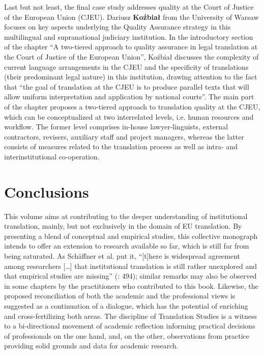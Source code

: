 \documentclass[output=paper]{langsci/langscibook}
\begin{document}
Last but not least, the final case study addresses quality at the Court of Justice of the European Union (CJEU). Dariusz \textbf{Koźbiał} from the University of Warsaw focuses on key aspects underlying the Quality Assurance strategy in this multilingual and supranational judiciary institution. In the introductory section of the chapter “A two-tiered approach to quality assurance in legal translation at the Court of Justice of the European Union”, Koźbiał discusses the complexity of current language arrangements in the CJEU and the specificity of translations (their predominant legal nature) in this institution, drawing attention to the fact that “the goal of translation at the CJEU is to produce parallel texts that will allow uniform interpretation and application by national courts”. The main part of the chapter proposes a two-tiered approach to translation quality at the CJEU, which can be conceptualized at two interrelated levels, i.e. human resources and workflow. The former level comprises in-house lawyer-linguists, external contractors, revisers, auxiliary staff and project managers, whereas the latter consists of measures related to the translation process as well as intra- and interinstitutional co-operation.

\section{Conclusions}

This volume aims at contributing to the deeper understanding of institutional translation, mainly, but not exclusively in the domain of EU translation. By presenting a blend of conceptual and empirical studies, this collective monograph intends to offer an extension to research available so far, which is still far from being saturated. As Schäffner et al. put it, “[t]here is widespread agreement among researchers […] that institutional translation is still rather unexplored and that empirical studies are missing” (\citeyear{SchäffnerEtAl2014}: 494); similar remarks may also be observed in some chapters by the practitioners who contributed to this book. Likewise, the proposed reconciliation of both the academic and the professional views is suggested as a continuation of a dialogue, which has the potential of enriching and cross-fertilizing both areas. The discipline of Translation Studies is a witness to a bi-directional movement of academic reflection informing practical decisions of professionals on the one hand, and, on the other, observations from practice providing solid grounds and data for academic research.

 
\sloppy
\printbibliography[heading=subbibliography,notkeyword=this] 
\end{document}
